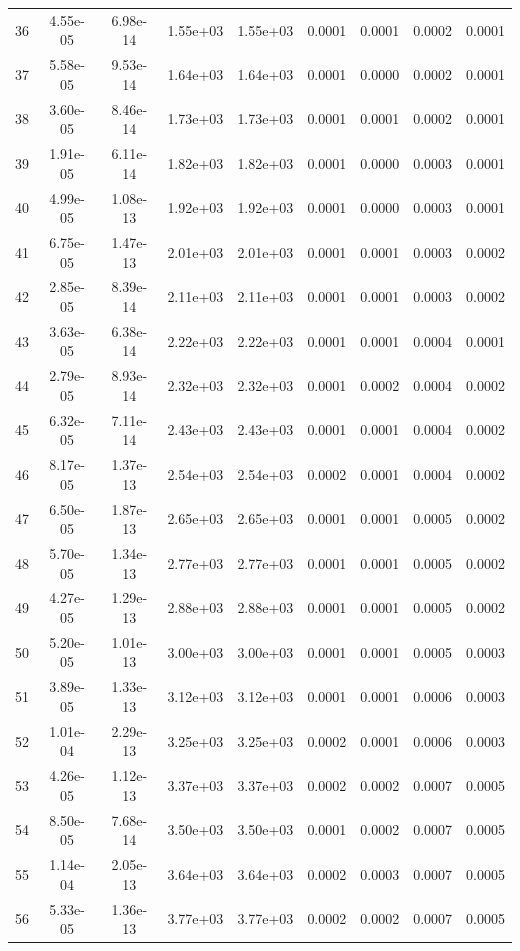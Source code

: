 \begin{longtable}{ccccccccc}
36 & 4.55e-05 & 6.98e-14 & 1.55e+03 & 1.55e+03 & 0.0001 & 0.0001 & 0.0002 & 0.0001 \\
37 & 5.58e-05 & 9.53e-14 & 1.64e+03 & 1.64e+03 & 0.0001 & 0.0000 & 0.0002 & 0.0001 \\
38 & 3.60e-05 & 8.46e-14 & 1.73e+03 & 1.73e+03 & 0.0001 & 0.0001 & 0.0002 & 0.0001 \\
39 & 1.91e-05 & 6.11e-14 & 1.82e+03 & 1.82e+03 & 0.0001 & 0.0000 & 0.0003 & 0.0001 \\
40 & 4.99e-05 & 1.08e-13 & 1.92e+03 & 1.92e+03 & 0.0001 & 0.0000 & 0.0003 & 0.0001 \\
41 & 6.75e-05 & 1.47e-13 & 2.01e+03 & 2.01e+03 & 0.0001 & 0.0001 & 0.0003 & 0.0002 \\
42 & 2.85e-05 & 8.39e-14 & 2.11e+03 & 2.11e+03 & 0.0001 & 0.0001 & 0.0003 & 0.0002 \\
43 & 3.63e-05 & 6.38e-14 & 2.22e+03 & 2.22e+03 & 0.0001 & 0.0001 & 0.0004 & 0.0001 \\
44 & 2.79e-05 & 8.93e-14 & 2.32e+03 & 2.32e+03 & 0.0001 & 0.0002 & 0.0004 & 0.0002 \\
45 & 6.32e-05 & 7.11e-14 & 2.43e+03 & 2.43e+03 & 0.0001 & 0.0001 & 0.0004 & 0.0002 \\
46 & 8.17e-05 & 1.37e-13 & 2.54e+03 & 2.54e+03 & 0.0002 & 0.0001 & 0.0004 & 0.0002 \\
47 & 6.50e-05 & 1.87e-13 & 2.65e+03 & 2.65e+03 & 0.0001 & 0.0001 & 0.0005 & 0.0002 \\
48 & 5.70e-05 & 1.34e-13 & 2.77e+03 & 2.77e+03 & 0.0001 & 0.0001 & 0.0005 & 0.0002 \\
49 & 4.27e-05 & 1.29e-13 & 2.88e+03 & 2.88e+03 & 0.0001 & 0.0001 & 0.0005 & 0.0002 \\
50 & 5.20e-05 & 1.01e-13 & 3.00e+03 & 3.00e+03 & 0.0001 & 0.0001 & 0.0005 & 0.0003 \\
51 & 3.89e-05 & 1.33e-13 & 3.12e+03 & 3.12e+03 & 0.0001 & 0.0001 & 0.0006 & 0.0003 \\
52 & 1.01e-04 & 2.29e-13 & 3.25e+03 & 3.25e+03 & 0.0002 & 0.0001 & 0.0006 & 0.0003 \\
53 & 4.26e-05 & 1.12e-13 & 3.37e+03 & 3.37e+03 & 0.0002 & 0.0002 & 0.0007 & 0.0005 \\
54 & 8.50e-05 & 7.68e-14 & 3.50e+03 & 3.50e+03 & 0.0001 & 0.0002 & 0.0007 & 0.0005 \\
55 & 1.14e-04 & 2.05e-13 & 3.64e+03 & 3.64e+03 & 0.0002 & 0.0003 & 0.0007 & 0.0005 \\
56 & 5.33e-05 & 1.36e-13 & 3.77e+03 & 3.77e+03 & 0.0002 & 0.0002 & 0.0007 & 0.0005 \\

\end{longtable}
